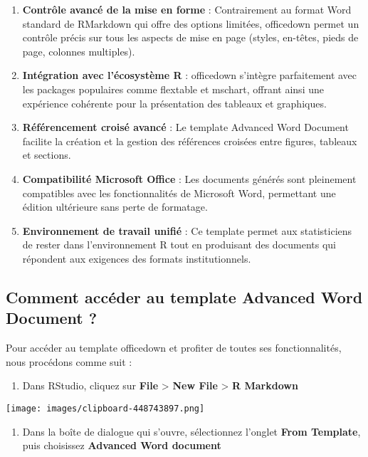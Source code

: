 \documentclass[
]{article}
\providecommand{\tightlist}{%
  \setlength{\itemsep}{0pt}\setlength{\parskip}{0pt}}
\begin{document}
\begin{enumerate}
\def\labelenumi{\arabic{enumi}.}
\item
  \textbf{Contrôle avancé de la mise en forme} : Contrairement au format
  Word standard de RMarkdown qui offre des options limitées, officedown
  permet un contrôle précis sur tous les aspects de mise en page
  (styles, en-têtes, pieds de page, colonnes multiples).
\item
  \textbf{Intégration avec l'écosystème R} : officedown s'intègre
  parfaitement avec les packages populaires comme flextable et mschart,
  offrant ainsi une expérience cohérente pour la présentation des
  tableaux et graphiques.
\item
  \textbf{Référencement croisé avancé} : Le template Advanced Word
  Document facilite la création et la gestion des références croisées
  entre figures, tableaux et sections.
\item
  \textbf{Compatibilité Microsoft Office} : Les documents générés sont
  pleinement compatibles avec les fonctionnalités de Microsoft Word,
  permettant une édition ultérieure sans perte de formatage.
\item
  \textbf{Environnement de travail unifié} : Ce template permet aux
  statisticiens de rester dans l'environnement R tout en produisant des
  documents qui répondent aux exigences des formats institutionnels.
\end{enumerate}

\subsection{Comment accéder au template Advanced Word Document
?}\label{comment-accuxe9der-au-template-advanced-word-document}

Pour accéder au template officedown et profiter de toutes ses
fonctionnalités, nous procédons comme suit :

\begin{enumerate}
\def\labelenumi{\arabic{enumi}.}
\tightlist
\item
  Dans RStudio, cliquez sur \textbf{File} \textgreater{} \textbf{New
  File} \textgreater{} \textbf{R Markdown}
\end{enumerate}

\texttt{[image: images/clipboard-448743897.png]}

\begin{enumerate}
\def\labelenumi{\arabic{enumi}.}
\setcounter{enumi}{1}
\tightlist
\item
  Dans la boîte de dialogue qui s'ouvre, sélectionnez l'onglet
  \textbf{From Template}, puis choisissez \textbf{Advanced Word
  document}
\end{enumerate}
\end{document}
